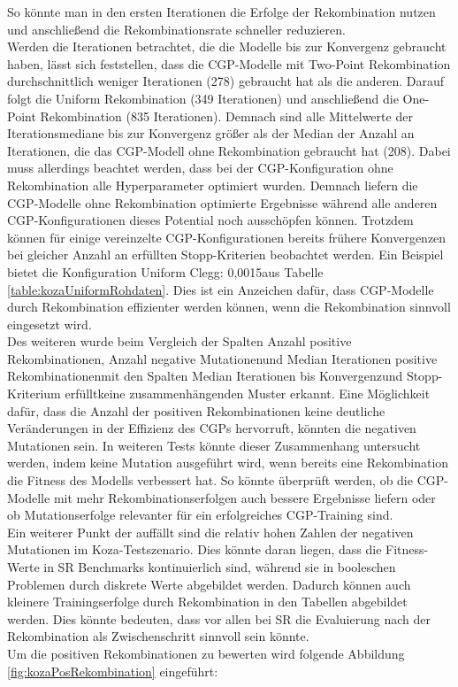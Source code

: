 So könnte man in den ersten Iterationen die Erfolge der Rekombination nutzen und anschließend die Rekombinationsrate schneller reduzieren.\\
Werden die Iterationen betrachtet, die die Modelle bis zur Konvergenz gebraucht haben, lässt sich feststellen, dass die CGP-Modelle mit Two-Point Rekombination durchschnittlich weniger Iterationen (278) gebraucht hat als die anderen.
Darauf folgt die Uniform Rekombination (349 Iterationen) und anschließend die One-Point Rekombination (835 Iterationen).
Demnach sind alle Mittelwerte der Iterationsmediane bis zur Konvergenz größer als der Median der Anzahl an Iterationen, die das CGP-Modell ohne Rekombination gebraucht hat (208).
Dabei muss allerdings beachtet werden, dass bei der CGP-Konfiguration ohne Rekombination alle Hyperparameter optimiert wurden.
Demnach liefern die CGP-Modelle ohne Rekombination optimierte Ergebnisse während alle anderen CGP-Konfigurationen dieses Potential noch ausschöpfen können.
Trotzdem können für einige vereinzelte CGP-Konfigurationen bereits frühere Konvergenzen bei gleicher Anzahl an erfüllten Stopp-Kriterien beobachtet werden.
Ein Beispiel bietet die Konfiguration \glqq Uniform Clegg: 0,0015\grqq\space aus Tabelle \ref{table:kozaUniformRohdaten}.
Dies ist ein Anzeichen dafür, dass CGP-Modelle durch Rekombination effizienter werden können, wenn die Rekombination sinnvoll eingesetzt wird.\\
Des weiteren wurde beim Vergleich der Spalten \glqq Anzahl positive Rekombinationen\grqq, \glqq Anzahl negative Mutationen\grqq\space und \glqq Median Iterationen positive Rekombinationen\grqq mit den Spalten \glqq Median Iterationen bis Konvergenz\grqq\space und \glqq Stopp-Kriterium erfüllt\grqq\space keine zusammenhängenden Muster erkannt.
Eine Möglichkeit dafür, dass die Anzahl der positiven Rekombinationen keine deutliche Veränderungen in der Effizienz des CGPs hervorruft, könnten die negativen Mutationen sein.
In weiteren Tests könnte dieser Zusammenhang untersucht werden, indem keine Mutation ausgeführt wird, wenn bereits eine Rekombination die Fitness des Modells verbessert hat.
So könnte überprüft werden, ob die CGP-Modelle mit mehr Rekombinationserfolgen auch bessere Ergebnisse liefern oder ob Mutationserfolge relevanter für ein erfolgreiches CGP-Training sind.\\
Ein weiterer Punkt der auffällt sind die relativ hohen Zahlen der negativen Mutationen im Koza-Testszenario.
Dies könnte daran liegen, dass die Fitness-Werte in SR Benchmarks kontinuierlich sind, während sie in booleschen Problemen durch diskrete Werte abgebildet werden.
Dadurch können auch kleinere Trainingserfolge durch Rekombination in den Tabellen abgebildet werden.
Dies könnte bedeuten, dass vor allen bei SR die Evaluierung nach der Rekombination als Zwischenschritt sinnvoll sein könnte.\\
Um die positiven Rekombinationen zu bewerten wird folgende Abbildung \ref{fig:kozaPosRekombination} eingeführt:

